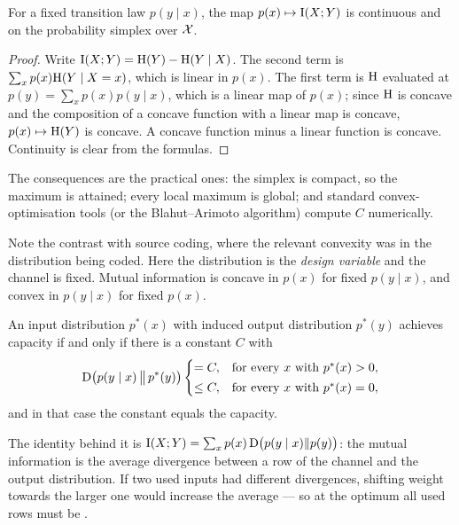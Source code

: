 
\begin{proposition}\label{prop:concavity}
For a fixed transition law $p(y\mid x)$, the map $p(x)\mapsto\mathrm{I}(X;Y)$ is
continuous and  on the probability simplex over $\mathcal{X}$.
\end{proposition}

\begin{proof}
Write $\mathrm{I}(X;Y)=\mathrm{H}(Y)-\mathrm{H}(Y\mid X)$. The second term is
$\sum_xp(x)\mathrm{H}(Y\mid X=x)$, which is linear in $p(x)$. The first term is
$\mathrm{H}$ evaluated at $p(y)=\sum_xp(x)p(y\mid x)$, which is a linear map of
$p(x)$; since $\mathrm{H}$ is concave and the composition of a concave function with a
linear map is concave, $p(x)\mapsto\mathrm{H}(Y)$ is concave. A concave function minus
a linear function is concave. Continuity is clear from the formulas.
\end{proof}

The consequences are the practical ones: the simplex is compact, so the maximum
is attained; every local maximum is global; and standard convex-optimisation
tools (or the Blahut--Arimoto algorithm) compute $C$ numerically.

\begin{remark}
Note the contrast with source coding, where the relevant convexity was in the
distribution being coded. Here the distribution is the \emph{design variable} and
the channel is fixed. Mutual information is concave in $p(x)$ for fixed
$p(y\mid x)$, and convex in $p(y\mid x)$ for fixed $p(x)$.
\end{remark}


\begin{theorem}\label{thm:kt-condition}
An input distribution $p^*(x)$ with induced output distribution $p^*(y)$ achieves
capacity if and only if there is a constant $C$ with
\[
  \mathrm{D}\bigl(p(y\mid x)\,\big\|\,p^*(y)\bigr)
  \begin{cases}
    =C, & \text{for every }x\text{ with }p^*(x)>0,\\[2pt]
    \le C, & \text{for every }x\text{ with }p^*(x)=0,
  \end{cases}
\]
and in that case the constant equals the capacity.
\end{theorem}

The identity behind it is
$\mathrm{I}(X;Y)=\sum_xp(x)\,\mathrm{D}\bigl(p(y\mid x)\|p(y)\bigr)$: the mutual information is
the average divergence between a row of the channel and the output distribution.
If two used inputs had different divergences, shifting weight towards the larger
one would increase the average --- so at the optimum all used rows must be
.

